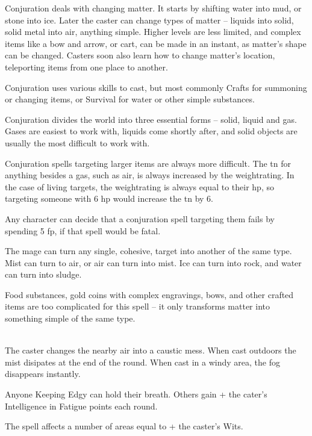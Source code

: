 \begin{multicols}{2}

\noindent
Conjuration deals with changing matter.
It starts by shifting water into mud, or stone into ice.  Later the caster can change types of matter -- liquids into solid, solid metal into air, anything simple.
Higher levels are less limited, and complex items like a bow and arrow, or cart, can be made in an instant, as matter's shape can be changed.  Casters soon also learn how to change matter's location, teleporting items from one place to another.

Conjuration uses various skills to cast, but most commonly Crafts for summoning or changing items, or Survival for water or other simple substances.

Conjuration divides the world into three essential forms -- solid, liquid and gas.  Gases are easiest to work with, liquids come shortly after, and solid objects are usually the most difficult to work with.

Conjuration spells targeting larger items are always more difficult.  The \gls{tn} for anything besides a gas, such as air, is always increased by the \gls{weightrating}.
In the case of living targets, the \gls{weightrating} is always equal to their \gls{hp}, so targeting someone with 6 \gls{hp} would increase the \gls{tn} by 6.

Any character can decide that a conjuration spell targeting them fails by spending 5 \gls{fp}, if that spell would be fatal.

\spelllevel

The mage can turn any single, cohesive, target into another of the same type.  Mist can turn to air, or air can turn into mist.
Ice can turn into rock, and water can turn into sludge.

Food substances, gold coins with complex engravings, bows, and other crafted items are too complicated for this spell -- it only transforms matter into something simple of the same type.

\\
The caster changes the nearby air into a caustic mess.  When cast outdoors the mist disipates at the end of the \gls{round}.  When cast in a windy area, the fog disappears instantly.

Anyone Keeping Edgy can hold their breath.  Others gain  + the cater's Intelligence in Fatigue points each \gls{round}.

The spell affects a number of areas equal to  + the caster's Wits.


\end{multicols}
